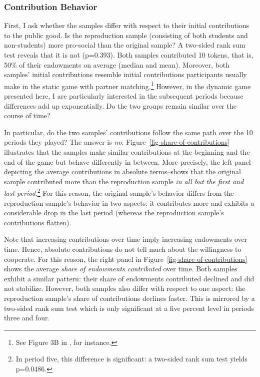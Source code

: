 \documentclass[
  authoryear,
  review,
  3p,
  onecolumn]{elsarticle}
\begin{document}
\hypertarget{sec-contributions}{%
\subsubsection{Contribution Behavior}\label{sec-contributions}}

First, I ask whether the samples differ with respect to their initial
contributions to the public good. Is the reproduction sample (consisting
of both students and non-students) more pro-social than the original
sample? A two-sided rank sum test reveals that it is not (p=0.393). Both
samples contributed 10 tokens, that is, 50\% of their endowments on
average (median and mean). Moreover, both samples' initial contributions
resemble initial contributions participants usually make in the static
game with partner matching.\footnote{See Figure 3B in
  \citet[p.989]{fehrgaechter2000}, for instance.} However, in the
dynamic game presented here, I are particularly interested in the
subsequent periods because differences add up exponentially. Do the two
groups remain similar over the course of time?

In particular, do the two samples' contributions follow the same path
over the 10 periods they played? The answer is \emph{no}.
Figure~\ref{fig-share-of-contributions} illustrates that the samples
make similar contributions at the beginning and the end of the game but
behave differently in between. More precisely, the left panel--depicting
the average contributions in absolute terms--shows that the original
sample contributed more than the reproduction sample \emph{in all but
the first and last period}.\footnote{In period five, this difference is
  significant: a two-sided rank sum test yields p=0.0486.} For this
reason, the original sample's behavior differs from the reproduction
sample's behavior in two aspects: it contributes more and exhibits a
considerable drop in the last period (whereas the reproduction sample's
contributions flatten).

Note that increasing contributions over time imply increasing endowments
over time. Hence, absolute contributions do not tell much about the
willingness to cooperate. For this reason, the right panel in
Figure~\ref{fig-share-of-contributions} shows the average \emph{share of
endowments contributed} over time. Both samples exhibit a similar
pattern: their share of endowments contributed declined and did not
stabilize. However, both samples also differ with respect to one aspect:
the reproduction sample's share of contributions declines faster. This
is mirrored by a two-sided rank sum test which is only significant at a
five percent level in periods three and four.
\end{document}
